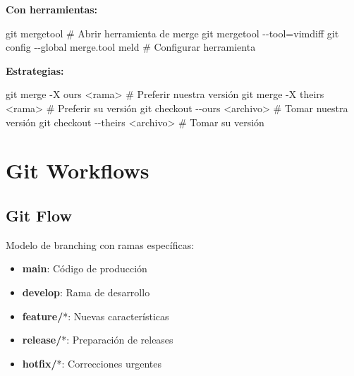 \documentclass[
  doc,
  floatsintext,
  longtable,
  a4paper,
  nolmodern,
  notxfonts,
  notimes,
  12pt,
  colorlinks=true,linkcolor=blue,citecolor=blue,urlcolor=blue]{apa7}
\newenvironment{Shaded}{\begin{snugshade}}{\end{snugshade}}
\newcommand{\AttributeTok}[1]{\textcolor[rgb]{0.40,0.45,0.13}{#1}}
\newcommand{\CommentTok}[1]{\textcolor[rgb]{0.37,0.37,0.37}{#1}}
\newcommand{\FunctionTok}[1]{\textcolor[rgb]{0.28,0.35,0.67}{#1}}
\newcommand{\NormalTok}[1]{\textcolor[rgb]{0.00,0.23,0.31}{#1}}
\newcommand{\OperatorTok}[1]{\textcolor[rgb]{0.37,0.37,0.37}{#1}}
\providecommand{\tightlist}{%
  \setlength{\itemsep}{0pt}\setlength{\parskip}{0pt}}
\begin{document}
\textbf{Con herramientas:}

\begin{Shaded}
\begin{Highlighting}[]
\FunctionTok{git}\NormalTok{ mergetool                        }\CommentTok{\# Abrir herramienta de merge}
\FunctionTok{git}\NormalTok{ mergetool }\AttributeTok{{-}{-}tool}\OperatorTok{=}\NormalTok{vimdiff}
\FunctionTok{git}\NormalTok{ config }\AttributeTok{{-}{-}global}\NormalTok{ merge.tool meld  }\CommentTok{\# Configurar herramienta}
\end{Highlighting}
\end{Shaded}

\textbf{Estrategias:}

\begin{Shaded}
\begin{Highlighting}[]
\FunctionTok{git}\NormalTok{ merge }\AttributeTok{{-}X}\NormalTok{ ours }\OperatorTok{\textless{}}\NormalTok{rama}\OperatorTok{\textgreater{}}         \CommentTok{\# Preferir nuestra versión}
\FunctionTok{git}\NormalTok{ merge }\AttributeTok{{-}X}\NormalTok{ theirs }\OperatorTok{\textless{}}\NormalTok{rama}\OperatorTok{\textgreater{}}       \CommentTok{\# Preferir su versión}
\FunctionTok{git}\NormalTok{ checkout }\AttributeTok{{-}{-}ours} \OperatorTok{\textless{}}\NormalTok{archivo}\OperatorTok{\textgreater{}}    \CommentTok{\# Tomar nuestra versión}
\FunctionTok{git}\NormalTok{ checkout }\AttributeTok{{-}{-}theirs} \OperatorTok{\textless{}}\NormalTok{archivo}\OperatorTok{\textgreater{}}  \CommentTok{\# Tomar su versión}
\end{Highlighting}
\end{Shaded}

\section{Git Workflows}\label{git-workflows}

\subsection{Git Flow}\label{git-flow}

Modelo de branching con ramas específicas:

\begin{itemize}
\tightlist
\item
  \textbf{main}: Código de producción
\item
  \textbf{develop}: Rama de desarrollo
\item
  \textbf{feature/}*: Nuevas características
\item
  \textbf{release/}*: Preparación de releases
\item
  \textbf{hotfix/}*: Correcciones urgentes
\end{itemize}
\end{document}
